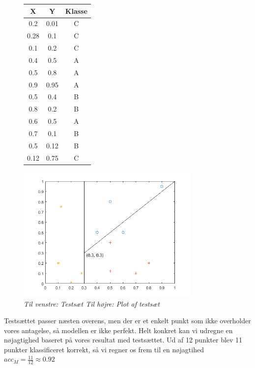 \documentclass{article}
\begin{document}
\begin{figure}[H]
	\begin{minipage}[t]{0.27\linewidth}
		\begin{flushleft}
			\begin{tabular}{c|c|c}
				X & Y & Klasse\\
				\hline
				0.2 & 0.01 & C\\
				0.28 & 0.1 & C\\
				0.1 & 0.2 & C\\
				0.4 & 0.5 & A\\
				0.5 & 0.8 & A\\
				0.9 & 0.95 & A\\
				0.5 & 0.4 & B\\
				0.8 & 0.2 & B\\
				0.6 & 0.5 & A\\
				0.7 & 0.1 & B\\
				0.5 & 0.12 & B\\
				0.12 & 0.75 & C
			\end{tabular} 
		\end{flushleft}
	\end{minipage}
	\begin{minipage}[t]{0.1\linewidth}
		\begin{flushright}
			\includegraphics[width=9cm]{decision_tree_example_plot_test}
		\end{flushright}
	\end{minipage}
	\caption{\textit{Til venstre: Testsæt Til højre: Plot af testsæt}}
\end{figure}

Testsættet passer næsten overens, men der er et enkelt punkt som ikke overholder vores antagelse, så modellen er ikke perfekt. Helt konkret kan vi udregne en nøjagtighed baseret på vores resultat med testsættet. Ud af 12 punkter blev 11 punkter klassificeret korrekt, så vi regner os frem til en nøjagtihed $acc_M=\frac{11}{12}\approx0.92$
\end{document}
